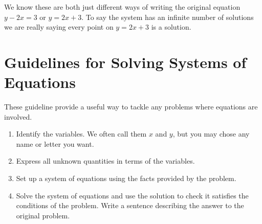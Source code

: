 We know these are both just different ways of writing the original equation $y -2 x =3$ or $y =2 x +3$. To say the system has an infinite number of solutions we are really saying every point
on $y =2 x +3$ is a solution. 


%



\section{Guidelines for Solving Systems of Equations}
These guideline provide a useful way to tackle any problems where equations are involved. 

\begin{enumerate}
	\item Identify the variables. We often call them $x$ and $y$, but you may chose any name or letter you want. 
	
	\item Express all unknown quantities
	in terms of the variables. 
	
	\item Set up a system of equations using the facts provided by the problem.
	
	
	\item Solve the system of equations and use the solution to check it satisfies the conditions of the
	problem. Write a sentence describing the answer to the original problem.  
\end{enumerate}


